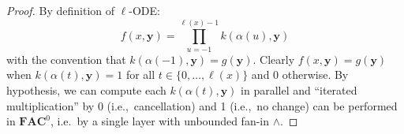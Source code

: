 \documentclass[11pt, oneside]{article}
\newenvironment{toappendix}{}{}
\newcommand{\fun}[1]{\mathsf{#1}}
\newcommand{\Nat}{\mathbb{N}}
\newcommand{\AC}{\mathbf{FAC}}
\newcommand{\tu}[1]{\mathbf{#1}}
\newtheorem{lemma}{Lemma}
\theoremstyle{definition}
\newtheorem{defn}{Definition}
\newtheorem{remark}{Remark}
\begin{document}
\begin{toappendix}
%
\begin{proof}
    By definition of $\ell$-ODE:
    $$
        f(x, \tu y) = \prod^{\ell(x)-1}_{u=-1} k(\alpha(u), \tu y)
    $$
    with the convention that $k(\alpha(-1), \tu y)=g(\tu y)$.
    Clearly $f(x, \tu y)=g(\tu y)$ when $k(\alpha(t), \tu y)=1$ for all $t\in \{0, \dots, \ell(x)\}$ and 0 otherwise.
    By hypothesis, we can compute each $k(\alpha(t), \tu y)$ in parallel and ``iterated multiplication'' by 0 (i.e.,~cancellation) and 1 (i.e.,~no change) can be performed in $\AC^0$, i.e.~by a single layer with unbounded fan-in $\wedge$.
\end{proof}
%
%

\end{toappendix}
\end{document}
